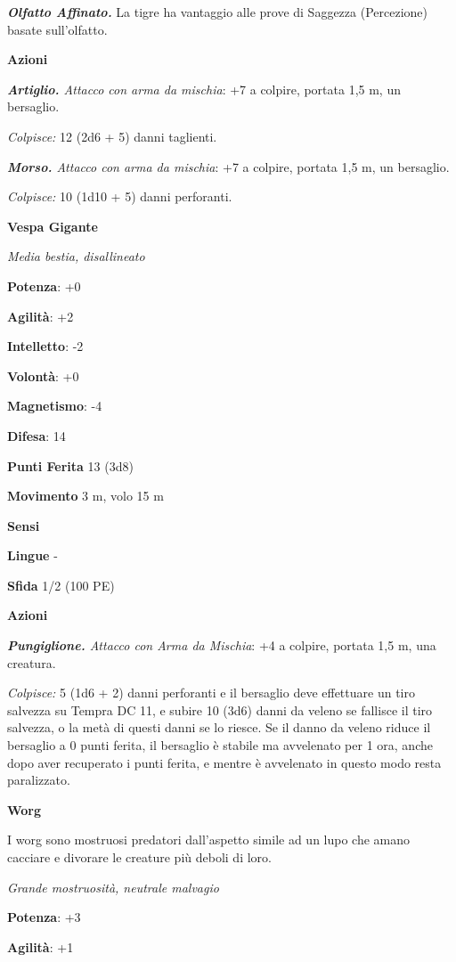 \begin{multicols}{2}
\emph{\textbf{Olfatto Affinato.}} La tigre ha vantaggio alle prove di
Saggezza (Percezione) basate sull'olfatto.

\textbf{Azioni}

\emph{\textbf{Artiglio.} Attacco con arma da mischia}: +7 a colpire,
portata 1,5 m, un bersaglio.

\emph{Colpisce:} 12 (2d6 + 5) danni taglienti.

\emph{\textbf{Morso.} Attacco con arma da mischia}: +7 a colpire,
portata 1,5 m, un bersaglio.

\emph{Colpisce:} 10 (1d10 + 5) danni perforanti.

\textbf{Vespa Gigante}

\emph{Media bestia, disallineato}

\textbf{Potenza}: +0

\textbf{Agilità}: +2

\textbf{Intelletto}: -2

\textbf{Volontà}: +0

\textbf{Magnetismo}: -4

\textbf{Difesa}: 14

\textbf{Punti Ferita} 13 (3d8)

\textbf{Movimento} 3 m, volo 15 m

\textbf{Sensi} 

\textbf{Lingue} -

\textbf{Sfida} 1/2 (100 PE)

\textbf{Azioni}

\emph{\textbf{Pungiglione.} Attacco con Arma da Mischia}: +4 a colpire,
portata 1,5 m, una creatura.

\emph{Colpisce:} 5 (1d6 + 2) danni perforanti e il bersaglio deve
effettuare un tiro salvezza su Tempra DC 11, e subire 10 (3d6)
danni da veleno se fallisce il tiro salvezza, o la metà di questi danni
se lo riesce. Se il danno da veleno riduce il bersaglio a 0 punti
ferita, il bersaglio è stabile ma avvelenato per 1 ora, anche dopo aver
recuperato i punti ferita, e mentre è avvelenato in questo modo resta
paralizzato.

\textbf{Worg}

I worg sono mostruosi predatori dall'aspetto simile ad un lupo che amano
cacciare e divorare le creature più deboli di loro.

\emph{Grande mostruosità, neutrale malvagio}

\textbf{Potenza}: +3

\textbf{Agilità}: +1


\end{multicols}
